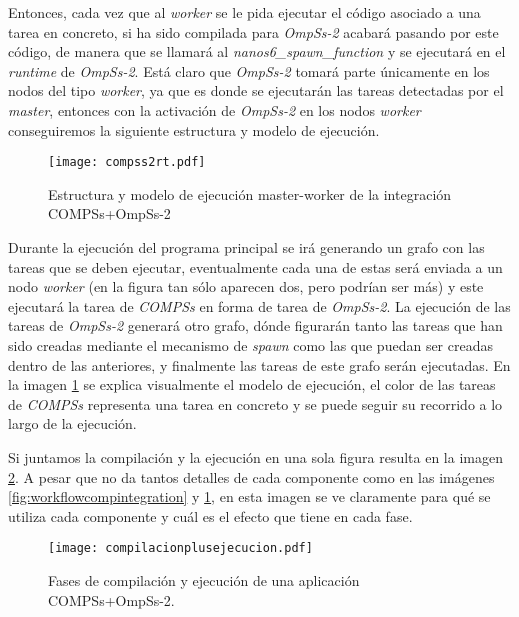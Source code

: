 Entonces, cada vez que al \textit{worker} se le pida ejecutar el código asociado a una tarea en concreto, si ha sido compilada para \textit{OmpSs-2} acabará pasando  por este código, de manera que se llamará al \textit{nanos6\_spawn\_function} y se ejecutará en el \textit{runtime} de \textit{OmpSs-2}. Está claro que \textit{OmpSs-2} tomará parte únicamente en los nodos del tipo \textit{worker}, ya que es donde se ejecutarán las tareas detectadas por el \textit{master}, entonces con la activación de \textit{OmpSs-2} en los nodos \textit{worker} conseguiremos la siguiente estructura y modelo de ejecución.

\par\bigskip

\begin{figure}[h]
    \centering 
    \caption{Estructura y modelo de ejecución master-worker de la integración COMPSs+OmpSs-2}
    \texttt{[image: compss2rt.pdf]}
    \label{fig:compssompssrt}
\end{figure}

Durante la ejecución del programa principal se irá generando un grafo con las tareas que se deben ejecutar, eventualmente cada una de estas será enviada a un nodo \textit{worker} (en la figura tan sólo aparecen dos, pero podrían ser más) y este ejecutará la tarea de \textit{COMPSs} en forma de tarea de \textit{OmpSs-2}.
La ejecución de las tareas de \textit{OmpSs-2} generará otro grafo, dónde figurarán tanto las tareas que han sido creadas mediante el mecanismo de \textit{spawn} como las que puedan ser creadas dentro de las anteriores, y finalmente las tareas de este grafo serán ejecutadas. En la imagen \ref{fig:compssompssrt} se explica visualmente el modelo de ejecución, el color de las tareas de \textit{COMPSs} representa una tarea en concreto y se puede seguir su recorrido a lo largo de la ejecución.
\par\bigskip

Si juntamos la compilación y la ejecución en una sola figura resulta en la imagen \ref{fig:compejec}. A pesar que no da tantos detalles de cada componente como en las imágenes \ref{fig:workflowcompintegration} y \ref{fig:compssompssrt}, en esta imagen se ve claramente para qué se utiliza cada componente y cuál es el efecto que tiene en cada fase.

\begin{figure}[h]
	\centering 
	\caption{Fases de compilación y ejecución de una aplicación COMPSs+OmpSs-2.}
	\texttt{[image: compilacionplusejecucion.pdf]}
	\label{fig:compejec}
\end{figure}

